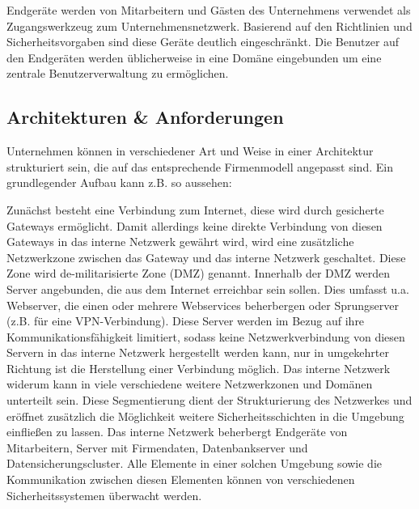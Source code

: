 Endgeräte werden von Mitarbeitern und Gästen des Unternehmens verwendet als Zugangswerkzeug zum Unternehmensnetzwerk. Basierend auf den Richtlinien und Sicherheitsvorgaben sind diese Geräte deutlich eingeschränkt. Die Benutzer auf den Endgeräten werden üblicherweise in eine Domäne eingebunden um eine zentrale Benutzerverwaltung zu ermöglichen.


\subsection{Architekturen \&  Anforderungen}
Unternehmen können in verschiedener Art und Weise in einer Architektur strukturiert sein, die auf das entsprechende Firmenmodell angepasst sind. 
Ein grundlegender Aufbau kann z.B. so aussehen:

Zunächst besteht eine Verbindung zum Internet, diese wird durch gesicherte Gateways ermöglicht. Damit allerdings keine direkte Verbindung von diesen Gateways in das interne Netzwerk gewährt wird, wird eine zusätzliche Netzwerkzone zwischen das Gateway und das interne Netzwerk geschaltet. Diese Zone wird de-militarisierte Zone (DMZ) genannt. Innerhalb der DMZ werden Server angebunden, die aus dem Internet erreichbar sein sollen. Dies umfasst u.a. Webserver, die einen oder mehrere Webservices beherbergen oder Sprungserver (z.B. für eine VPN-Verbindung). Diese Server werden im Bezug auf ihre Kommunikationsfähigkeit limitiert, sodass keine Netzwerkverbindung von diesen Servern in das interne Netzwerk hergestellt werden kann, nur in umgekehrter Richtung ist die Herstellung einer Verbindung möglich. Das interne Netzwerk widerum kann in viele verschiedene weitere Netzwerkzonen und Domänen unterteilt sein. Diese Segmentierung dient der Strukturierung des Netzwerkes und eröffnet zusätzlich die Möglichkeit weitere Sicherheitsschichten in die Umgebung einfließen zu lassen. Das interne Netzwerk beherbergt Endgeräte von Mitarbeitern, Server mit Firmendaten, Datenbankserver und Datensicherungscluster. Alle Elemente in einer solchen Umgebung sowie die Kommunikation zwischen diesen Elementen können von verschiedenen Sicherheitssystemen überwacht werden. 

